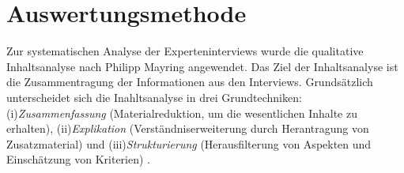 


\section{Auswertungsmethode}
Zur systematischen Analyse der Experteninterviews wurde die qualitative Inhaltsanalyse nach Philipp Mayring angewendet. Das Ziel der Inhaltsanalyse ist die Zusammentragung der Informationen aus den Interviews. Grundsätzlich unterscheidet sich die Inahltsanalyse in drei Grundtechniken: (i)\emph{Zusammenfassung} (Materialreduktion, um die wesentlichen Inhalte zu erhalten), (ii)\emph{Explikation} (Verständniserweiterung durch Herantragung von Zusatzmaterial) und (iii)\emph{Strukturierung} (Herausfilterung von Aspekten und Einschätzung von Kriterien) \cite{mayring1994qualitative}.\\

